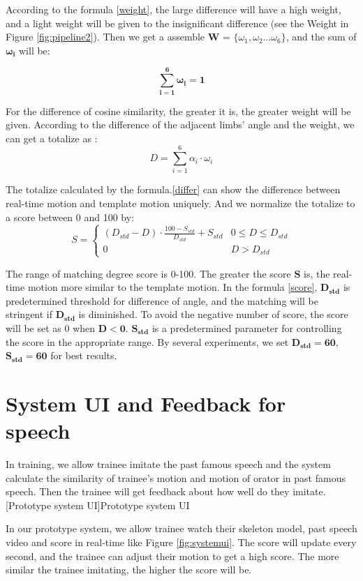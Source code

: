 \par According to the formula \ref{weight}, the large difference will have a high weight, and a light weight will be given to the insignificant difference (see the Weight in Figure \ref {fig:pipeline2}). Then we get a assemble $\bm{W}$ = $\lbrace \omega_{1},\omega_{2}...\omega_{6}\rbrace$, and the sum of $\bm{\omega_{i}}$ will be:

\begin{equation}
\bm{\sum_{i=1}^{6} \omega_{i}=1}
\end{equation}

\par For the difference of cosine similarity, the greater it is, the greater weight will be given. According to the difference of the adjacent limbs' angle and the weight, we can get a totalize as :
\begin{equation}
D = \sum_{i=1}^{6}\alpha_{i}\cdot\omega_{i}        
\label{differ}
\end{equation}
\par The totalize calculated by the formula.\ref{differ} can show the difference between real-time motion and template motion uniquely. And we normalize the totalize to a score between 0 and 100 by:
\begin{equation}
S = \begin{cases}
    (D_{std}-D)\cdot\frac{100-S_{std}}{D_{std}}+S_{std} &  0\leq D\leq D_{std} \\ 0&  D> D_{std} 
 \end{cases}
 \label{score}
\end{equation}

\par The range of matching degree score is 0-100. The greater the score $\bm{S}$ is, the real-time motion more similar to the template motion. In the formula \ref{score}, $\bm{D_{std}}$ is predetermined threshold for difference of angle, and the matching will be stringent if $\bm{D_{std}}$ is diminished. To avoid the negative number of score, the score will be set as 0 when $\bm{D<0}$. $\bm{S_{std}}$ is a predetermined parameter for controlling the score in the appropriate range. By several experiments, we set $\bm{D_{std}=60}$, $\bm{S_{std}=60}$ for best results. 

\section{System UI and Feedback for speech}
\par In training, we allow trainee imitate the past famous speech and the system calculate the similarity of trainee's motion and motion of orator in past famous speech. Then the trainee will get feedback about how well do they imitate. 
[Prototype system UI]{Prototype system UI}
\par In our prototype system, we allow trainee watch their skeleton model, past speech video and score in real-time like Figure \ref{fig:systemui}. The score will update every second, and the trainee can adjust their motion to get a high score. The more similar the trainee imitating, the higher the score will be.

